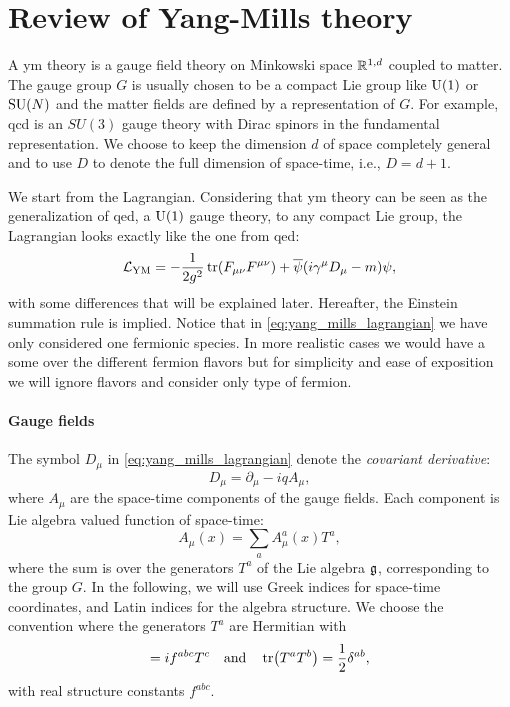 \section{Review of Yang-Mills theory}
\label{sec:yang_mills_theory}

A \ac{ym} theory is a gauge field theory on Minkowski space $\mathbb{R}^{1,d}$ coupled to matter.
    The gauge group $G$ is usually chosen to be a compact Lie group like $\mathrm{U}(1)$ or $\text{SU}(N)$ and the matter fields are defined by a representation of $G$.
    For example, \ac{qcd} is an $SU(3)$ gauge theory with Dirac spinors in the fundamental representation.
We choose to keep the dimension $d$ of space completely general and to use $D$ to denote the full dimension of space-time, i.e., $D=d+1$.

We start from the Lagrangian.
Considering that \ac{ym} theory can be seen as the generalization of \ac{qed}, a $\mathrm{U}(1)$ gauge theory, to any compact Lie group, the Lagrangian looks exactly like the one from \ac{qed}:
\begin{equation}
    \mathcal{L}_{\text{YM}} = - \frac{1}{2 g^2} \tr(F_{\mu \nu} F^{\mu \nu}) + \overline{\psi} \qty( i \gamma^{\mu} D_{\mu} - m ) \psi,
    \label{eq:yang_mills_lagrangian}
\end{equation}
with some differences that will be explained later.
Hereafter, the Einstein summation rule is implied.
Notice that in \eqref{eq:yang_mills_lagrangian} we have only considered one fermionic species.
In more realistic cases we would have a some over the different fermion flavors but for simplicity and ease of exposition we will ignore flavors and consider only type of fermion.




\paragraph*{Gauge fields}

The symbol $D_{\mu}$ in \eqref{eq:yang_mills_lagrangian} denote the \emph{covariant derivative}:
\begin{equation}
    D_{\mu} = \partial_{\mu} - i q A_{\mu},
    \label{eq:covariant_derivative}
\end{equation}
where $A_{\mu}$ are the space-time components of the gauge fields.
Each component is Lie algebra valued function of space-time:
\begin{equation}
    A_{\mu}(x) = \sum_{a} A_{\mu}^a(x) T^a,
\end{equation}
where the sum is over the generators $T^a$ of the Lie algebra $\mathfrak{g}$, corresponding to the group $G$.
In the following, we will use Greek indices for space-time coordinates, and Latin indices for the algebra structure.
We choose the convention where the generators $T^a$ are Hermitian with
\begin{equation}
    [T^a, T^b] = i f^{abc} T^c
    \qand
    \tr(T^a T^b) = \frac{1}{2} \delta^{ab},
\end{equation}
with real structure constants $f^{abc}$.

